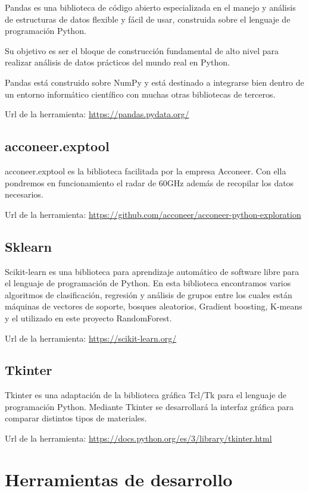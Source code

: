 Pandas es una biblioteca de código abierto especializada en el manejo y análisis de estructuras de datos flexible y fácil de usar, construida sobre el lenguaje de programación Python.

Su objetivo es ser el bloque de construcción fundamental de alto nivel para realizar análisis de datos prácticos del mundo real en Python.

Pandas está construido sobre NumPy y está destinado a integrarse bien dentro de un entorno informático científico con muchas otras bibliotecas de terceros.

Url de la herramienta: \url{https://pandas.pydata.org/}

\subsection{acconeer.exptool}

acconeer.exptool es la biblioteca facilitada por la empresa Acconeer. Con ella pondremos en funcionamiento el radar de 60GHz además de recopilar los datos necesarios.

Url de la herramienta: \url{https://github.com/acconeer/acconeer-python-exploration}


\subsection{Sklearn}

Scikit-learn es una biblioteca para aprendizaje automático de software libre para el lenguaje de programación de Python.
En esta biblioteca encontramos varios algoritmos de clasificación, regresión y análisis de grupos entre los cuales están máquinas de vectores de soporte, bosques aleatorios, Gradient boosting, K-means y el utilizado en este proyecto RandomForest.

Url de la herramienta: \url{https://scikit-learn.org/}

\subsection{Tkinter}

Tkinter es una adaptación de la biblioteca gráfica Tcl/Tk \cite{Tcl} para el lenguaje de programación Python. Mediante Tkinter se desarrollará la interfaz gráfica para comparar distintos tipos de materiales.

Url de la herramienta: \url{https://docs.python.org/es/3/library/tkinter.html}

\section{Herramientas de desarrollo}
